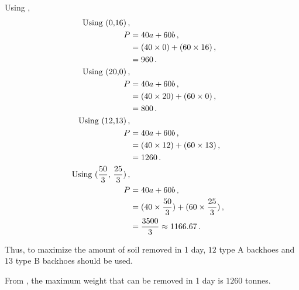 \begin{subquestions}
\begin{subsubquestions}
Using ,
\begin{align}
	\text{Using (0,16)} \,, \nonumber \\
	P & = 40a + 60b \,, \nonumber \\
	  & = (40 \times 0) + (60 \times 16) \,, \nonumber \\
	  & = 960 \,. \\
	\text{Using (20,0)} \,, \nonumber \\
	P & = 40a + 60b \,, \nonumber \\
      & = (40 \times 20) + (60 \times 0) \,, \nonumber \\
	  & = 800 \,. \\		  
	\text{Using (12,13)} \,, \nonumber \\
	P & = 40a + 60b \,, \nonumber \\
	  & = (40 \times 12) + (60 \times 13) \,, \nonumber \\
	  & = 1260 \,. \label{2012:q1:eqn:Profit} \\
	\text{Using ($\frac{50}{3}$, $\frac{25}{3}$)} \,, \nonumber \\
	P & = 40a + 60b \,, \nonumber \\
	  & = (40 \times \frac{50}{3}) + (60 \times \frac{25}{3}) \,, \nonumber \\
	  & = \frac{3500}{3} \approx 1166.67 \,. 
\end{align}

Thus, to maximize the amount of soil removed in 1 day, $12$ type A backhoes and $13$ type B backhoes should be used.


\subsubquestion

From , the maximum weight that can be removed in 1 day is $1260$ tonnes.

\end{subsubquestions}

\end{subquestions}

